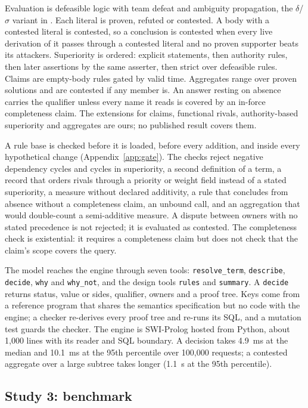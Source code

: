 \documentclass[11pt]{article}
\begin{document}
Evaluation is defeasible logic with team defeat and ambiguity propagation, the $\delta$/$\sigma$ variant in
\citet{maher2021}. Each literal is proven, refuted or contested. A body with a contested literal is contested, so a
conclusion is contested when every live derivation of it passes through a contested literal and no proven supporter
beats its attackers. Superiority is ordered: explicit statements, then authority rules, then later assertions by the
same asserter, then strict over defeasible rules. Claims are empty-body rules gated by valid time. Aggregates range
over proven solutions and are contested if any member is. An answer resting on absence carries the qualifier unless
every name it reads is covered by an in-force completeness claim. The extensions for claims, functional rivals,
authority-based superiority and aggregates are ours; no published result covers them.

A rule base is checked before it is loaded, before every addition, and inside every hypothetical change
(Appendix~\ref{app:gate}). The checks reject negative dependency cycles and cycles in superiority, a second
definition of a term, a record that orders rivals through a priority or weight field instead of a stated
superiority, a measure
without declared additivity, a rule that concludes from absence without a completeness claim, an unbound call, and
an aggregation that would double-count a semi-additive measure. A dispute between owners with no stated precedence
is not rejected; it is evaluated as contested. The completeness check is existential: it requires a completeness
claim but does not check that the claim's scope covers the query.

The model reaches the engine through seven tools: \texttt{resolve\_term}, \texttt{describe}, \texttt{decide},
\texttt{why} and \texttt{why\_not}, and the design tools \texttt{rules} and \texttt{summary}. A \texttt{decide} returns
status, value or sides, qualifier, owners and a proof tree. Keys come from a reference program that shares the
semantics specification but no code with the engine; a checker re-derives every proof tree and re-runs its SQL, and
a mutation test guards the checker. The engine is SWI-Prolog hosted from Python, about 1,000 lines with its reader
and SQL boundary. A decision takes 4.9~ms at the median and 10.1~ms at the 95th percentile over 100,000 requests; a
contested aggregate over a large subtree takes longer (1.1~s at the 95th percentile).

\subsection{Study 3: benchmark}
\label{sec:v3}
\end{document}
